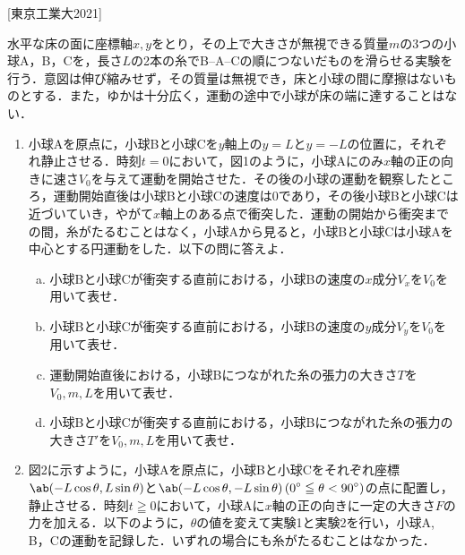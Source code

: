 

\noindent
{} [東京工業大2021]

水平な床の面に座標軸$x, y$をとり，その上で大きさが無視できる質量$m$の3つの小球A，B，Cを，長さ$L$の2本の糸でB--A--Cの順につないだものを滑らせる実験を行う．意図は伸び縮みせず，その質量は無視でき，床と小球の間に摩擦はないものとする．また，ゆかは十分広く，運動の途中で小球が床の端に達することはない．

\begin{enumerate}[label={〔\Alph*〕}]
  \item {\hzw}小球Aを原点に，小球Bと小球Cを$y$軸上の$y = L$と$y = -L$の位置に，それぞれ静止させる．時刻$t = 0$において，図1のように，小球Aにのみ$x$軸の正の向きに速さ$V_0$を与えて運動を開始させた．その後の小球の運動を観察したところ，運動開始直後は小球Bと小球Cの速度は0であり，その後小球Bと小球Cは近づいていき，やがて$x$軸上のある点で衝突した．運動の開始から衝突までの間，糸がたるむことはなく，小球Aから見ると，小球Bと小球Cは小球Aを中心とする円運動をした．以下の問に答えよ．
  \begin{enumerate}[(a)]
    \item {\hzw}小球Bと小球Cが衝突する直前における，小球Bの速度の$x$成分$V_x$を$V_0$を用いて表せ．
    \item {\hzw}小球Bと小球Cが衝突する直前における，小球Bの速度の$y$成分$V_y$を$V_0$を用いて表せ．
    \item {\hzw}運動開始直後における，小球Bにつながれた糸の張力の大きさ$T$を$V_0, m, L$を用いて表せ．
    \item {\hzw}小球Bと小球Cが衝突する直前における，小球Bにつながれた糸の張力の大きさ$T'$を$V_0, m, L$を用いて表せ．
  \end{enumerate}
  \item {\hzw}図2に示すように，小球Aを原点に，小球Bと小球Cをそれぞれ座標$\ds \ab(-L\cos\theta, L\sin\theta)$と$\ds \ab(-L\cos\theta, -L\sin\theta)\, ( 0\deg \leqq \theta <  90 \deg)$の点に配置し，静止させる．時刻$t \geqq 0$において，小球Aに$x$軸の正の向きに一定の大きさ$F$の力を加える．以下のように，$\theta$の値を変えて実験1と実験2を行い，小球A, B，Cの運動を記録した．いずれの場合にも糸がたるむことはなかった．
  


\end{enumerate}
